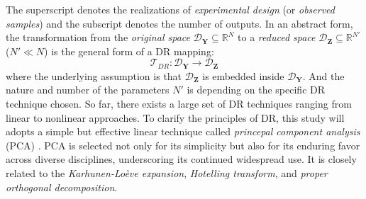 \documentclass{tufte-handout}
\begin{document}
The superscript denotes the realizations of \textit{experimental design} (or \textit{observed samples}) and the subscript denotes the number of outputs. In an abstract form, the transformation from the \textit{original space} $\mathcal{D}_{\boldsymbol{Y}} \subseteq \mathbb{R}^{N}$ to a \textit{reduced space} $\mathcal{D}_{\boldsymbol{Z}} \subseteq \mathbb{R}^{N'}$ ($N' \ll N$) is the general form of a DR mapping:
\begin{equation}
    \mathcal{T}_{DR} : \mathcal{D}_{\boldsymbol{Y}} \rightarrow \mathcal{D}_{\boldsymbol{Z}}
\end{equation}
where the underlying assumption is that $\mathcal{D}_{\boldsymbol{Z}}$ is embedded inside $\mathcal{D}_{\boldsymbol{Y}}$. And the nature and number of the parameters $N'$ is depending on the specific DR technique chosen. So far, there exists a large set of DR techniques ranging from linear to nonlinear approaches. To clarify the principles of DR, this study will adopts a simple but effective linear technique called \textit{princepal component analysis} (PCA) \cite[-6cm]{wagner2020,wagner2021,nagel2020,vohra2020}. PCA is selected not only for its simplicity but also for its enduring favor across diverse disciplines, underscoring its continued widespread use. It is closely related to the \textit{Karhunen-Loève expansion}, \textit{Hotelling
transform}, and \textit{proper orthogonal decomposition}.
\end{document}
